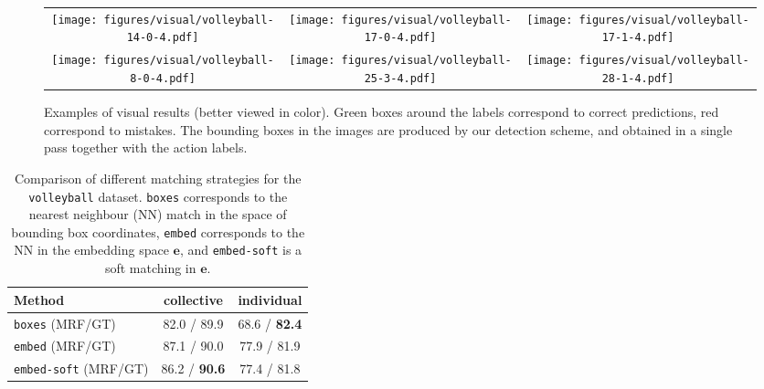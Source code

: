 \documentclass[10pt,twocolumn,letterpaper]{article}
\newcommand{\be}[0]{\bm{e}}
\begin{document}
\renewcommand{\tabcolsep}{1pt}
\begin{figure*}[htp!]
\begin{center}
\begin{tabular}{ccc}
\texttt{[image: figures/visual/volleyball-14-0-4.pdf]} &
\texttt{[image: figures/visual/volleyball-17-0-4.pdf]} &
\texttt{[image: figures/visual/volleyball-17-1-4.pdf]} \\
\texttt{[image: figures/visual/volleyball-8-0-4.pdf]} &
\texttt{[image: figures/visual/volleyball-25-3-4.pdf]} &
\texttt{[image: figures/visual/volleyball-28-1-4.pdf]} \\
\end{tabular}
\end{center}
\caption{Examples of visual results (better viewed in color). 
Green boxes around the labels correspond to correct predictions, red correspond to 
mistakes. The bounding boxes in the images are produced by our detection scheme, 
and obtained in a single pass together with the action labels.}
\label{fi:eval:visual}
\vspace{-0.25cm}
\end{figure*}
\renewcommand{\tabcolsep}{6pt}





\begin{table}[ht!]
  \begin{center}
    \begin{tabular}{|l|c|c|}
      \hline
      Method  & collective & individual \\\hline
      \texttt{boxes} (MRF/GT) & 82.0 / 89.9  & 68.6 / \textbf{82.4}  \\
      \texttt{embed} (MRF/GT) & 87.1 / 90.0   & 77.9 / 81.9  \\
\texttt{embed-soft} (MRF/GT) &  86.2 / \textbf{90.6}  & 77.4 / 81.8  \\\hline 
    \end{tabular}
  \end{center}
  \caption{Comparison of different matching strategies for the
    \texttt{volleyball} dataset. \texttt{boxes}
    corresponds  to the nearest neighbour (NN) match in the space of bounding
    box coordinates, \texttt{embed} corresponds to the NN in the embedding space
    $\be$, and \texttt{embed-soft} is a soft matching in $\be$.}
  \label{tab:eval:volley-matching}
  \vspace{-0.25cm}
\end{table}
\end{document}
